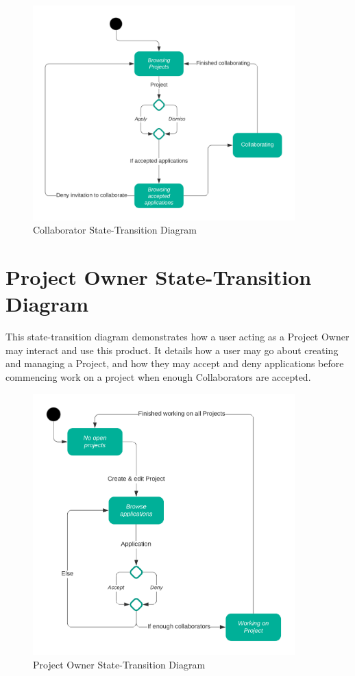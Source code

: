 \documentclass[a4paper,11pt]{report}
\begin{document}
\begin{figure}[H]
    \centering
    \includegraphics[width=0.9\textwidth,keepaspectratio]{std-collaborator.png}
    \caption{Collaborator State-Transition Diagram}
    \label{fig:collaborator-std}
\end{figure}

\section{Project Owner State-Transition Diagram}
This state-transition diagram demonstrates how a user acting as a Project Owner
may interact and use this product. It details how a user may go about creating
and managing a Project, and how they may accept and deny applications before
commencing work on a project when enough Collaborators are accepted.

\begin{figure}[h]
    \centering
    \includegraphics[width=0.9\textwidth,keepaspectratio]{std-projectowner.png}
    \caption{Project Owner State-Transition Diagram}
    \label{fig:projectowner-std}
\end{figure}
\end{document}
